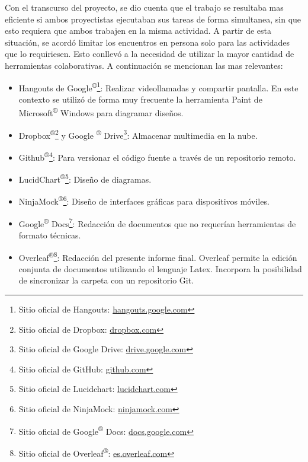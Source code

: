         \par Con el transcurso del proyecto, se dio cuenta que el trabajo se resultaba mas eficiente si ambos proyectistas ejecutaban sus tareas de forma simultanea, sin que esto requiera que ambos trabajen en la misma actividad. A partir de esta situación, se acordó limitar los encuentros en persona solo para las actividades que lo requiriesen. Esto conllevó a la necesidad de utilizar la mayor cantidad de herramientas colaborativas. A continuación se mencionan las mas relevantes:
        \begin{itemize}
            
            \item Hangouts de Google\textsuperscript{®}\footnote{ Sitio oficial de Hangouts: \url{hangouts.google.com}}: Realizar videollamadas y compartir pantalla. En este contexto se utilizó de forma muy frecuente la herramienta Paint de Microsoft\textsuperscript{®} Windows para diagramar diseños.
            
            \item Dropbox\textsuperscript{®}\footnote{ Sitio oficial de Dropbox: \url{dropbox.com}} y Google \textsuperscript{®} Drive\footnote{ Sitio oficial de Google Drive: \url{drive.google.com}}: Almacenar multimedia en la nube.
            
            \item Github\textsuperscript{®}\footnote{ Sitio oficial de GitHub: \url{github.com}}: Para versionar el código fuente a través de un repositorio remoto.
            
            \item LucidChart\textsuperscript{®}\footnote{ Sitio oficial de Lucidchart: \url{lucidchart.com}}: Diseño de diagramas.
            
            \item NinjaMock\textsuperscript{®}\footnote{ Sitio oficial de NinjaMock: \url{ninjamock.com}}: Diseño de interfaces gráficas para dispositivos móviles.
            
            \item Google\textsuperscript{®} Docs\footnote{ Sitio oficial de Google\textsuperscript{®} Docs: \url{docs.google.com}}: Redacción de documentos que no requerían herramientas de formato técnicas.
            
            \item Overleaf\textsuperscript{®}\footnote{ Sitio oficial de Overleaf\textsuperscript{®}: \url{es.overleaf.com}}: Redacción del presente informe final. Overleaf permite la edición conjunta de documentos utilizando el lenguaje Latex. Incorpora la posibilidad de sincronizar la carpeta con un repositorio Git.
            
        \end{itemize}
        
